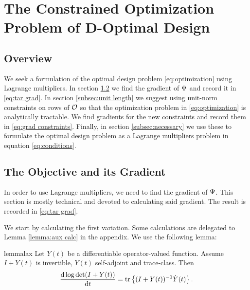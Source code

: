 \documentclass{amsart}
\numberwithin{equation}{section}
\begin{document}
\section{The Constrained Optimization Problem of D-Optimal Design}\label{section:D and grad}

\subsection{Overview}
We seek a formulation of the optimal design problem
\eqref{eq:optimization} using Lagrange multipliers. In section
\ref{section:objective} we find the gradient of $\Psi$ and record it
in \eqref{eq:tar grad}. In section \ref{subsec:unit length} we suggest
using unit-norm constraints on rows of $\mathcal{O}$ so that the optimization
problem in \eqref{eq:optimization} is analytically tractable. We find
gradients for the new constraints and record them in \eqref{eq:grad
  constraints}. Finally, in section \ref{subsec:necessary} we use
these to formulate the optimal design problem as a Lagrange
multipliers problem in equation \eqref{eq:conditions}.


\subsection{The Objective and its Gradient}\label{section:objective}
In order to use Lagrange multipliers, we need to find the gradient of
$\Psi$. This section is mostly technical and devoted to calculating
said gradient. The result is recorded in \eqref{eq:tar grad}.

We start by calculating the first variation. Some calculations are
delegated to Lemma \ref{lemma:aux calc} in the appendix. We use
the following lemma:
\begin{restatable*}{lemma}{lax}\label{lemma:lax}
  Let $Y(t)$ be a differentiable operator-valued function. Assume 
  $I+Y(t)$ is invertible, $Y(t)$ self-adjoint and trace-class. Then
  \begin{equation*}
    \frac{\text{\textup{d}} \log \det (I+Y(t))}{\text{\textup{d}} t} = \textup{tr}\left \{(I+Y(t))^{-1} \dot{Y}(t) \right \}.
  \end{equation*}
\end{restatable*}
\end{document}
